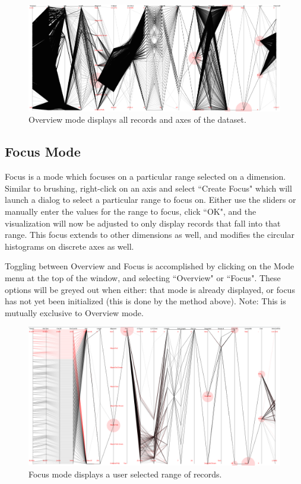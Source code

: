 \documentclass[12pt]{ucthesis}
\begin{document}
\begin{figure}[htb!]
 \centering
 \includegraphics[width=\textwidth]{images/documentation/overview.jpg}
 \caption[Overview mode displays all records of the dataset.]{Overview mode displays all records and axes of the dataset.}
 \label{fig:doc}
\end{figure}

\subsection{Focus Mode}
Focus is a mode which focuses on a particular range selected on a dimension. Similar to brushing, right-click on an axis and select ``Create Focus" which will launch a dialog to select a particular range to focus on. Either use the sliders or manually enter the values for the range to focus, click ``OK", and the visualization will now be adjusted to only display records that fall into that range. This focus extends to other dimensions as well, and modifies the circular histograms on discrete axes as well.

Toggling between Overview and Focus is accomplished by clicking on the Mode menu at the top of the window, and selecting ``Overview" or ``Focus". These options will be greyed out when either: that mode is already displayed, or focus has not yet been initialized (this is done by the method above). Note: This is mutually exclusive to Overview mode.

\begin{figure}[htb!]
 \centering
 \includegraphics[width=\textwidth]{images/documentation/brush_focus.jpg}
 \caption[Focus mode displays a user selected range of records.]{Focus mode displays a user selected range of records.}
 \label{fig:doc}
\end{figure}
\end{document}
